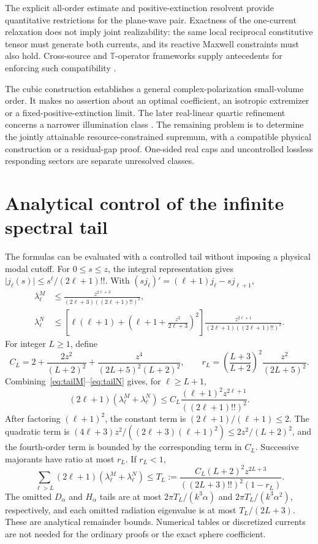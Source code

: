 \documentclass[11pt]{article}
\newcommand{\abs}[1]{\lvert #1\rvert}
\begin{document}
The explicit all-order estimate and positive-extinction resolvent provide quantitative restrictions for the plane-wave pair. Exactness of the one-current relaxation does not imply joint realizability: the same local reciprocal constitutive tensor must generate both currents, and its reactive Maxwell constraints must also hold. Cross-source and $\mathbb T$-operator frameworks supply antecedents for enforcing such compatibility \citep{Molesky2020,Molesky2022,Shim2024}.

The cubic construction establishes a general complex-polarization small-volume order. It makes no assertion about an optimal coefficient, an isotropic extremizer or a fixed-positive-extinction limit. The later real-linear quartic refinement concerns a narrower illumination class \citep{WangZhengQuartic2026}. The remaining problem is to determine the jointly attainable resource-constrained supremum, with a compatible physical construction or a residual-gap proof. One-sided real caps and uncontrolled lossless responding sectors are separate unresolved classes.

\appendix
\section{Analytical control of the infinite spectral tail}\label{app:tails}
The formulas can be evaluated with a controlled tail without imposing a physical modal cutoff. For $0\leq s\leq z$, the integral representation gives $\abs{j_\ell(s)}\leq s^\ell/(2\ell+1)!!$. With $(sj_\ell)'=(\ell+1)j_\ell-sj_{\ell+1}$,
\begin{align}
 \lambda^M_\ell&\leq\frac{z^{2\ell+3}}{(2\ell+3)((2\ell+1)!!)^2},\label{eq:tailM}\\
 \lambda^N_\ell&\leq\left[\ell(\ell+1)+
 \left(\ell+1+\frac{z^2}{2\ell+3}\right)^2\right]
 \frac{z^{2\ell+1}}{(2\ell+1)((2\ell+1)!!)^2}.\label{eq:tailN}
\end{align}
For integer $L\geq1$, define
\[
 C_L=2+\frac{2z^2}{(L+2)^2}
       +\frac{z^4}{(2L+5)^2(L+2)^2},\qquad
 r_L=\left(\frac{L+3}{L+2}\right)^2\frac{z^2}{(2L+5)^2}.
\]
Combining~\eqref{eq:tailM}--\eqref{eq:tailN} gives, for $\ell\geq L+1$,
\[
 (2\ell+1)(\lambda^M_\ell+\lambda^N_\ell)
 \leq C_L\frac{(\ell+1)^2z^{2\ell+1}}{((2\ell+1)!!)^2}.
\]
After factoring $(\ell+1)^2$, the constant term is $(2\ell+1)/(\ell+1)\leq2$. The quadratic term is $(4\ell+3)z^2/((2\ell+3)(\ell+1)^2)\leq2z^2/(L+2)^2$, and the fourth-order term is bounded by the corresponding term in $C_L$. Successive majorants have ratio at most $r_L$. If $r_L<1$,
\begin{equation}\label{eq:tail}
 \sum_{\ell>L}(2\ell+1)(\lambda^M_\ell+\lambda^N_\ell)
 \leq T_L:=\frac{C_L(L+2)^2z^{2L+3}}{((2L+3)!!)^2(1-r_L)}.
\end{equation}
The omitted $D_\alpha$ and $H_\alpha$ tails are at most $2\pi T_L/(k^3\alpha)$ and $2\pi T_L/(k^3\alpha^2)$, respectively, and each omitted radiation eigenvalue is at most $T_L/(2L+3)$. These are analytical remainder bounds. Numerical tables or discretized currents are not needed for the ordinary proofs or the exact sphere coefficient.



\end{document}
